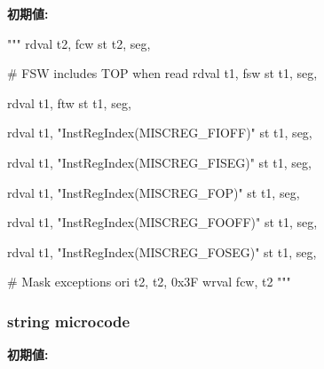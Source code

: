 \label{namespaceinsts_1_1x87_1_1control_1_1save__and__restore__x87__environment_a6525b04e77de26872497b0caec47c0e7}
{\bfseries 初期値:}
\begin{DoxyCode}
"""
    rdval t2, fcw
    st t2, seg, %

    # FSW includes TOP when read
    rdval t1, fsw
    st t1, seg, %

    rdval t1, ftw
    st t1, seg, %

    rdval t1, "InstRegIndex(MISCREG_FIOFF)"
    st t1, seg, %

    rdval t1, "InstRegIndex(MISCREG_FISEG)"
    st t1, seg, %

    rdval t1, "InstRegIndex(MISCREG_FOP)"
    st t1, seg, %

    rdval t1, "InstRegIndex(MISCREG_FOOFF)"
    st t1, seg, %

    rdval t1, "InstRegIndex(MISCREG_FOSEG)"
    st t1, seg, %

    # Mask exceptions
    ori t2, t2, 0x3F
    wrval fcw, t2
"""
\end{DoxyCode}
\hypertarget{namespaceinsts_1_1x87_1_1control_1_1save__and__restore__x87__environment_a770f11a173e99389a8802f0107ed8f52}{
\subsubsection[{microcode}]{\setlength{\rightskip}{0pt plus 5cm}string {\bf microcode}}}
\label{namespaceinsts_1_1x87_1_1control_1_1save__and__restore__x87__environment_a770f11a173e99389a8802f0107ed8f52}
{\bfseries 初期値:}
\begin{DoxyCode}
'''
def macroop FLDENV_M {
'''
\end{DoxyCode}
